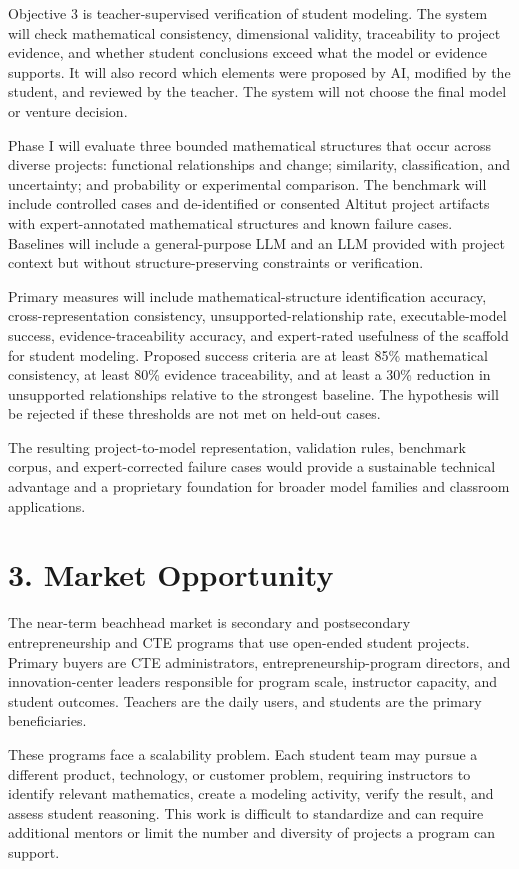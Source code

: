 Objective 3 is teacher-supervised verification of student modeling. The system will check mathematical consistency, dimensional validity, traceability to project evidence, and whether student conclusions exceed what the model or evidence supports. It will also record which elements were proposed by AI, modified by the student, and reviewed by the teacher. The system will not choose the final model or venture decision.

Phase I will evaluate three bounded mathematical structures that occur across diverse projects: functional relationships and change; similarity, classification, and uncertainty; and probability or experimental comparison. The benchmark will include controlled cases and de-identified or consented Altitut project artifacts with expert-annotated mathematical structures and known failure cases. Baselines will include a general-purpose LLM and an LLM provided with project context but without structure-preserving constraints or verification.

Primary measures will include mathematical-structure identification accuracy, cross-representation consistency, unsupported-relationship rate, executable-model success, evidence-traceability accuracy, and expert-rated usefulness of the scaffold for student modeling. Proposed success criteria are at least 85\% mathematical consistency, at least 80\% evidence traceability, and at least a 30\% reduction in unsupported relationships relative to the strongest baseline. The hypothesis will be rejected if these thresholds are not met on held-out cases.

The resulting project-to-model representation, validation rules, benchmark corpus, and expert-corrected failure cases would provide a sustainable technical advantage and a proprietary foundation for broader model families and classroom applications.

\section{3. Market Opportunity}

The near-term beachhead market is secondary and postsecondary entrepreneurship and CTE programs that use open-ended student projects. Primary buyers are CTE administrators, entrepreneurship-program directors, and innovation-center leaders responsible for program scale, instructor capacity, and student outcomes. Teachers are the daily users, and students are the primary beneficiaries.

These programs face a scalability problem. Each student team may pursue a different product, technology, or customer problem, requiring instructors to identify relevant mathematics, create a modeling activity, verify the result, and assess student reasoning. This work is difficult to standardize and can require additional mentors or limit the number and diversity of projects a program can support.

